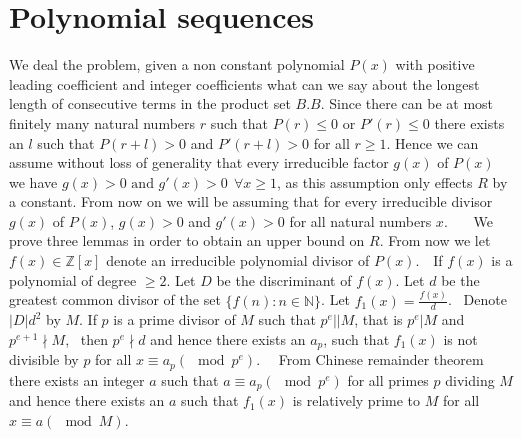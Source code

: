 \documentclass{amsart}
\newtheorem{Lemma 1}{Lemma}[section]
\newtheorem{Lemma 3}[Lemma 1]{Lemma}
\newtheorem{Lucas The}[Lemma 1]{Theorem}
\newtheorem{lem 1}[Lemma 1]{Lemma}
\newtheorem{Corollary 1}[Lemma 1]{Corollary}
\newtheorem{Corollary 2}[Lemma 1]{Corollary}
\begin{document}
	\section{Polynomial sequences}
	We deal the problem, given a non constant polynomial $P(x)$ with positive leading coefficient and integer coefficients what can we say about the longest length of consecutive terms in the product set $B.B$.
	Since there can be at most finitely many natural numbers $r$ such that $P(r)\leq0$ or $P'(r)\leq 0$ there exists an $l$ such that $P(r+l)>0$ and $P'(r+l)>0$ for all $r\geq 1$. Hence we can assume without loss of generality that every irreducible factor $g(x)$ of $P(x)$ we have $g(x)>0 \text{ and } g'(x)>0~~ \forall x\geq 1$, as this assumption only effects $R$ by a constant. From now on we will be assuming that for every irreducible divisor $g(x)$ of $P(x)$, $g(x)>0$ and $g'(x)>0$ for all natural numbers $x$.    We prove three lemmas in order to obtain an upper bound on $R$.
	From now we let $f(x)\in \mathbb{Z}[x]$ denote an irreducible polynomial divisor of $P(x)$.  If $f(x)$ is a polynomial of degree $\geq 2$. Let $D$ be the discriminant of $f(x)$. Let $d$ be the greatest common divisor of the set $\{f(n): n\in \mathbb{N}\}$. Let $f_1(x)=\frac{f(x)}{d}$.  Denote $|D|d^2$ by $M$. If $p$ is a prime divisor of $M$ such that $p^e||M$, that is $p^e|M$ and $p^{e+1}\nmid M$,  then $p^e\nmid d$ and hence there exists an $a_p$, such that $f_1(x)$ is not divisible by $p$ for all $x\equiv a_p (\mod p^e)$.   From Chinese remainder theorem there exists an integer $a$ such that $a\equiv a_p(\mod p^e)$ for all primes $p$ dividing $M$ and hence there exists an $a$ such that $f_1(x)$ is relatively prime to $M$ for all $x\equiv a (\mod M)$. 
\end{document}
